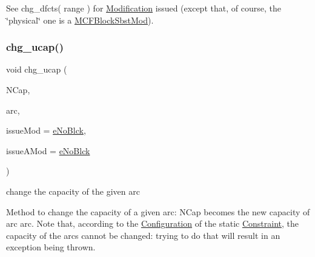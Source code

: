 See chg\+\_\+dfcts( range ) for \mbox{\hyperlink{class_s_m_spp__di__unipi__it_1_1_modification}{Modification}} issued (except that, of course, the \char`\"{}physical\char`\"{} one is a \mbox{\hyperlink{class_s_m_spp__di__unipi__it_1_1_m_c_f_block_sbst_mod}{M\+C\+F\+Block\+Sbst\+Mod}}). \mbox{\label{class_s_m_spp__di__unipi__it_1_1_m_c_f_block_a1777a59a4297b24604825e498b069741}} 
\subsubsection{\texorpdfstring{chg\+\_\+ucap()}{chg\_ucap()}}
{\footnotesize\ttfamily void chg\+\_\+ucap (\begin{DoxyParamCaption}\item[{\mbox{\hyperlink{class_s_m_spp__di__unipi__it_1_1_m_c_f_block_a956c123a5a6b2b52f033ca1987acd80e}{c\+\_\+\+F\+Number}}}]{N\+Cap,  }\item[{\mbox{\hyperlink{class_s_m_spp__di__unipi__it_1_1_m_c_f_block_aee6156e2ce80720d57a082d80f39d8cc}{c\+\_\+\+Index}}}]{arc,  }\item[{\mbox{\hyperlink{group___modification___t_y_p_e_s_ga544246d8c462e9a2d817c2c30797968f}{c\+\_\+\+Mod\+Param}}}]{issue\+Mod = {\ttfamily \mbox{\hyperlink{group___modification___t_y_p_e_s_gga48fddcdd03a03f49b7e389ca1ed938d4ada69e89c5f46e563d8a13cfa6830c136}{e\+No\+Blck}}},  }\item[{\mbox{\hyperlink{group___modification___t_y_p_e_s_ga544246d8c462e9a2d817c2c30797968f}{c\+\_\+\+Mod\+Param}}}]{issue\+A\+Mod = {\ttfamily \mbox{\hyperlink{group___modification___t_y_p_e_s_gga48fddcdd03a03f49b7e389ca1ed938d4ada69e89c5f46e563d8a13cfa6830c136}{e\+No\+Blck}}} }\end{DoxyParamCaption})}



change the capacity of the given arc 

Method to change the capacity of a given arc\+: N\+Cap becomes the new capacity of arc arc. Note that, according to the \mbox{\hyperlink{class_s_m_spp__di__unipi__it_1_1_configuration}{Configuration}} of the static \mbox{\hyperlink{class_s_m_spp__di__unipi__it_1_1_constraint}{Constraint}}, the capacity of the arcs cannot be changed\+: trying to do that will result in an exception being thrown.

